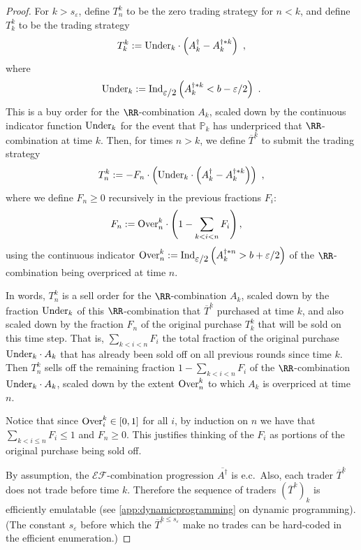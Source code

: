 \documentclass[authordate,onecolumn,noenvironments]{miri-tech-article}
\numberwithin{equation}{subsection}
\newcommand{\seq}[1]{{\overline{#1}}}
\newcommand{\ec}[1][\ ]{e.c.#1}
\newcommand{\exfeatures}{\mathcal{E\!F}} %
\newcommand{\aff}{A}
\newcommand{\trade}{T}%
\newcommand{\Trader}{\seq{\trade}} %
\newcommand{\gens}{\dagger}
\newcommand{\BelState}{\mathbb{P}}
\newcommand{\pt}{\BelState}
\newcommand{\underpriced}{{\rm Under}}
\newcommand{\overpriced}{{\rm Over}}
\newcommand{\localportfoliovalue}{b}
\newcommand{\ctsind}[1]{\operatorname{Ind}_{\text{\small{${#1}$}}}} %
\begin{document}
\begin{proof}
For $k > s_\varepsilon$, define $\trade^k_n$ to be the
zero trading strategy
for $n < k$, and define $\trade^k_k$ to be the trading strategy
%
\[ \trade^k_k :=
\underpriced_k
 \cdot \left( \aff^\gens_{k} - \aff^{\gens * k}_{k}\right)\ ,
\]
%
where
%
\[ \underpriced_k :=
  \ctsind{\varepsilon/2}\left( \aff^{\gens * k}_{k} < \localportfoliovalue - \varepsilon/2
\right) \ .
\]
%
This is a buy order for the $\RR$-combination $\aff_{k}$,
scaled down by the continuous indicator function $\underpriced_k$ for the event that $\pt_k$ has underpriced that
$\RR$-combination at time $k$.
%
Then, for times $n>k$, we define $\Trader^k$ to submit the trading strategy 
%
\[ \trade^k_n :=  
-F_n  \cdot 
\left(\underpriced_k \cdot \left( \aff^\gens_{k}  - \aff^{\gens * k}_{k}  \right)\right) \ ,
\]
%
where we define $F_n \geq 0$ recursively in 
the previous fractions $F_i$:
%
\begin{align*}
 F_n &:= 
\overpriced_n^k \cdot
\left( 1- \sum_{k<i<n} F_i \right) ,
\end{align*}
%
using the continuous indicator $\overpriced_n^k := \ctsind{\varepsilon/2}\left( \aff^{\gens * n}_{k}
> \localportfoliovalue + \varepsilon/2 \right)$ of the $\RR$-combination being overpriced at time $n$.



%
In words, 
$\trade^k_n$ is a sell order for the $\RR$-combination 
$\aff_{k}$, scaled down by the fraction $\underpriced_k$ of this $\RR$-combination that $\Trader^k$ purchased at time $k$, 
 and also scaled down by the fraction $F_n$ of the original purchase $\trade^k_k$ 
 that will be sold on this time step. 
 That is, 
  $\sum_{k<i<n} F_i$  the total fraction of the original purchase $\underpriced_k \cdot \aff_k$
  that has already been sold off on all previous rounds since time $k$.
Then $\trade^k_n$ sells off the remaining fraction $1- \sum_{k<i<n} F_i$ of the  $\RR$-combination 
$\underpriced_k \cdot \aff_k$, scaled down by the extent $\overpriced_n^k$ to which $\aff_k$ is overpriced at time $n$. 

Notice that since $\overpriced_i^k\in [0,1]$ for all $i$, by induction on $n$ we have that $\sum_{k<i\leq n} F_i \leq 1$ and $F_n \ge 0$. This justifies
thinking of the $F_i$ as portions of the original purchase being sold off. 

By assumption, the $\exfeatures$-combination progression $\seq{\aff^\gens}$ is \ec Also, each trader $\Trader^k$ does not trade before time $k$.   
Therefore the sequence of traders $(\Trader^k)_k$ is efficiently emulatable (see \ref{app:dynamicprogramming} on dynamic programming).   (The constant $s_\varepsilon$ before which the $\Trader^{k\le s_\varepsilon}$
  make no trades can be hard-coded in the efficient
  enumeration.)



\end{proof}
\end{document}
